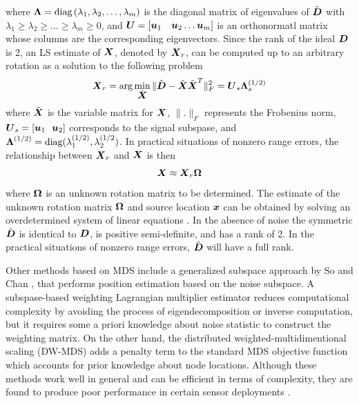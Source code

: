 where $\mbox{\boldmath{$\Lambda$}} = \mbox{diag}\left(\lambda_1, \lambda_2, \ldots, \lambda_m\right)$ is the diagonal matrix of eigenvalues of $\hat{\mbox{\boldmath$D$}}$ with $\lambda_1 \geq \lambda_2 \geq \ldots \geq \lambda_m \geq 0$, and $\mbox{\boldmath$U$} = \left[\mbox{\boldmath$u$}_1 \quad \mbox{\boldmath$u$}_2  \ldots \mbox{\boldmath$u$}_m \right]$ is an orthonormatl matrix whose columns are the corresponding eigenvectors. Since the rank of the ideal $\mbox{\boldmath$D$}$ is 2, an LS estimate of $\mbox{\boldmath$X$}$, denoted by $\mbox{\boldmath$X$}_r$, can be computed up to an arbitrary rotation as a solution to the following problem  \cite{classMDS}
\begin{equation}
\nonumber
\mbox{\boldmath$X$}_r = \mbox{arg}\min_{\tilde{\mbox{\boldmath$X$}}} \|\hat{\mbox{\boldmath$D$}} - \tilde{\mbox{\boldmath$X$}}\tilde{\mbox{\boldmath$X$}}^T\|^2_{F} = \mbox{\boldmath$U$}_s\mbox{\boldmath{$\Lambda$}}_s^{(1/2)}
\end{equation}
where $\tilde{\mbox{\boldmath$X$}}$ is the variable matrix for $\mbox{\boldmath$X$}$, $\|.\|_F$ represents the Frobenius norm, $\mbox{\boldmath$U$}_s = \left[\mbox{\boldmath$u$}_1 \ \ \mbox{\boldmath$u$}_2\right]$ corresponds to the signal subspase, and $\mbox{\boldmath{$\Lambda$}}^{(1/2)} = \mbox{diag}(\lambda_1^{(1/2)}, \lambda_2^{(1/2})$. In practical situations of nonzero range errors, the relationship between  $\mbox{\boldmath$X$}_r$ and $\mbox{\boldmath$X$}$ is then 
\begin{equation}
\nonumber
\mbox{\boldmath$X$}  \approx \mbox{\boldmath$X$}_r\mbox{\boldmath{$\Omega$}}
\end{equation} 
where $\mbox{\boldmath{$\Omega$}}$ is an unknown rotation matrix to be determined. The estimate of the unknown rotation matrix $\mbox{\boldmath{$\Omega$}}$ and source location $\mbox{\boldmath$x$}$ can be obtained by solving an overdetermined system of linear equations \cite{classMDS}. In the absence of noise the symmetric $\hat{\mbox{\boldmath$D$}}$ is identical to $\mbox{\boldmath$D$}$, is positive semi-definite, and has a rank of 2. In the practical situations of nonzero range errors, $\hat{\mbox{\boldmath$D$}}$ will have a full rank. 

Other methods based on MDS include a generalized subspace approach by So and Chan \cite{genMDS}, that performs  position estimation based on the noise subspace. A subspase-based weighting Lagrangian multiplier estimator \cite{fastMDS} reduces computational complexity by avoiding the process of eigendecomposition or inverse computation, but it requires some a priori knowledge about noise statistic to construct the weighting matrix. On the other hand, the distributed weighted-multidimentional scaling (DW-MDS) \cite{dwMDS} adds a penalty term to the standard MDS objective function which accounts for prior knowledge about node locations. Although these methods work well in general and can be efficient in terms of complexity, they
are found to produce poor performance in certain sensor deployments  \cite{UWB}.


